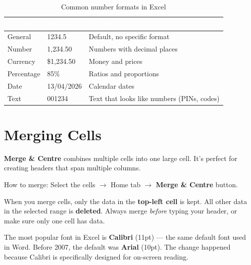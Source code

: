 \begin{table}[H]
\centering
\caption{Common number formats in Excel}
\label{tab:number-formats}
\renewcommand{\arraystretch}{1.3}
\begin{tabularx}{\textwidth}{l l X}
\toprule
\rowcolor{HeaderRow}
\textcolor{white}{\textbf{Format}} & \textcolor{white}{\textbf{Example}} & \textcolor{white}{\textbf{Use For}} \\
\midrule
\rowcolor{RowLight} General & 1234.5 & Default, no specific format \\
\rowcolor{RowDark} Number & 1,234.50 & Numbers with decimal places \\
\rowcolor{RowLight} Currency & \$1,234.50 & Money and prices \\
\rowcolor{RowDark} Percentage & 85\% & Ratios and proportions \\
\rowcolor{RowLight} Date & 13/04/2026 & Calendar dates \\
\rowcolor{RowDark} Text & 001234 & Text that looks like numbers (PINs, codes) \\
\bottomrule
\end{tabularx}
\end{table}

\section{Merging Cells}
\label{sec:merge}

\textbf{Merge \& Centre} combines multiple cells into one large cell. It's perfect for creating headers that span multiple columns.

How to merge: Select the cells $\rightarrow$ Home tab $\rightarrow$ \textbf{Merge \& Centre} button.

\begin{warnbox}
When you merge cells, only the data in the \textbf{top-left cell} is kept. All other data in the selected range is \textbf{deleted}. Always merge \emph{before} typing your header, or make sure only one cell has data.
\end{warnbox}


\begin{funfact}
The most popular font in Excel is \textbf{Calibri} (11pt) --- the same default font used in Word. Before 2007, the default was \textbf{Arial} (10pt). The change happened because Calibri is specifically designed for on-screen reading.
\end{funfact}

